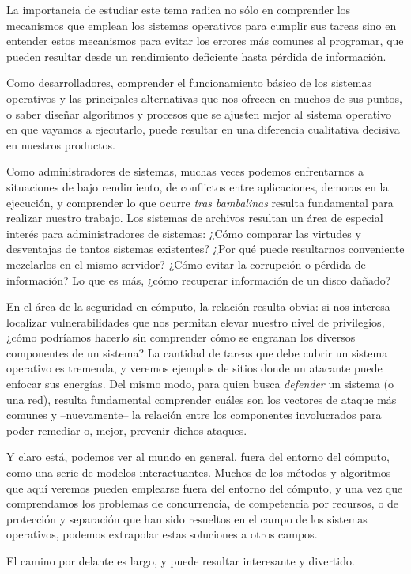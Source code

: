 \documentclass[11pt,fleqn]{book} %
\begin{document}
La importancia de estudiar este tema radica no sólo en comprender los
mecanismos que emplean los sistemas operativos para cumplir sus tareas
sino en entender estos mecanismos para evitar los errores más
comunes al programar, que pueden resultar desde un rendimiento
deficiente hasta pérdida de información.

Como desarrolladores, comprender el funcionamiento básico de los
sistemas operativos y las principales alternativas que nos ofrecen en
muchos de sus puntos, o saber diseñar algoritmos y procesos que se ajusten
mejor al sistema operativo en que vayamos a ejecutarlo, puede resultar
en una diferencia cualitativa decisiva en nuestros productos.

Como administradores de sistemas, muchas veces podemos enfrentarnos a
situaciones de bajo rendimiento, de conflictos entre aplicaciones,
demoras en la ejecución, y comprender lo que ocurre \emph{tras bambalinas}
resulta fundamental para realizar nuestro trabajo. Los sistemas de
archivos resultan un área de especial interés para administradores de
sistemas: ¿Cómo comparar las virtudes y desventajas de tantos sistemas
existentes? ¿Por qué puede resultarnos conveniente mezclarlos en el
mismo servidor? ¿Cómo evitar la corrupción o pérdida de información?
Lo que es más, ¿cómo recuperar información de un disco dañado?

En el área de la seguridad en cómputo, la relación resulta obvia:
si nos interesa localizar vulnerabilidades que nos permitan elevar
nuestro nivel de privilegios, ¿cómo podríamos hacerlo sin comprender
cómo se engranan los diversos componentes de un sistema? La cantidad
de tareas que debe cubrir un sistema operativo es tremenda, y veremos
ejemplos de sitios donde un atacante puede enfocar sus energías. Del
mismo modo, para quien busca \emph{defender} un sistema (o una red), resulta
fundamental comprender cuáles son los vectores de ataque más comunes y
–nuevamente– la relación entre los componentes involucrados para poder
remediar o, mejor, prevenir dichos ataques.

Y claro está, podemos ver al mundo en general, fuera del entorno del
cómputo, como una serie de modelos interactuantes. Muchos de los
métodos y algoritmos que aquí veremos pueden emplearse fuera del
entorno del cómputo, y una vez que comprendamos los problemas de
concurrencia, de competencia por recursos, o de protección y separación
que han sido resueltos en el campo de los sistemas operativos, podemos
extrapolar estas soluciones a otros campos.

El camino por delante es largo, y puede resultar interesante y divertido.
\end{document}
